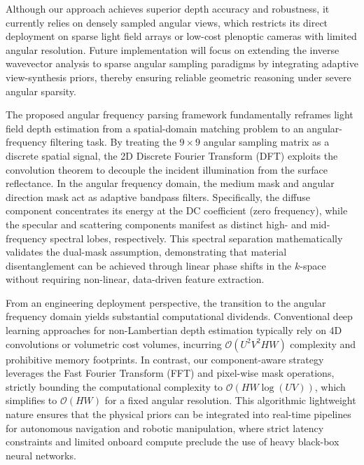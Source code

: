 \documentclass[lettersize,journal]{IEEEtran}
\begin{document}
Although our approach achieves superior depth accuracy and robustness, it currently relies on densely sampled angular views, which restricts its direct deployment on sparse light field arrays or low-cost plenoptic cameras with limited angular resolution. Future implementation will focus on extending the inverse wavevector analysis to sparse angular sampling paradigms by integrating adaptive view-synthesis priors, thereby ensuring reliable geometric reasoning under severe angular sparsity.


The proposed angular frequency parsing framework fundamentally reframes light field depth estimation from a spatial-domain matching problem to an angular-frequency filtering task. By treating the $9 \times 9$ angular sampling matrix as a discrete spatial signal, the 2D Discrete Fourier Transform (DFT) exploits the convolution theorem to decouple the incident illumination from the surface reflectance. In the angular frequency domain, the medium mask and angular direction mask act as adaptive bandpass filters. Specifically, the diffuse component concentrates its energy at the DC coefficient (zero frequency), while the specular and scattering components manifest as distinct high- and mid-frequency spectral lobes, respectively. This spectral separation mathematically validates the dual-mask assumption, demonstrating that material disentanglement can be achieved through linear phase shifts in the $k$-space without requiring non-linear, data-driven feature extraction.

From an engineering deployment perspective, the transition to the angular frequency domain yields substantial computational dividends. Conventional deep learning approaches for non-Lambertian depth estimation typically rely on 4D convolutions or volumetric cost volumes, incurring $\mathcal{O}(U^2 V^2 HW)$ complexity and prohibitive memory footprints. In contrast, our component-aware strategy leverages the Fast Fourier Transform (FFT) and pixel-wise mask operations, strictly bounding the computational complexity to $\mathcal{O}(HW \log(UV))$, which simplifies to $\mathcal{O}(HW)$ for a fixed angular resolution. This algorithmic lightweight nature ensures that the physical priors can be integrated into real-time pipelines for autonomous navigation and robotic manipulation, where strict latency constraints and limited onboard compute preclude the use of heavy black-box neural networks.
\end{document}
